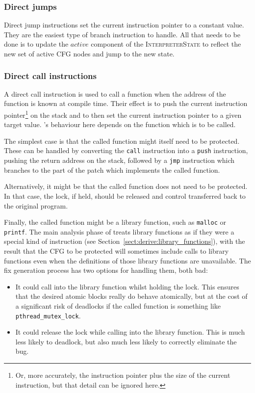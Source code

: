 \subsubsection{Direct jumps}

 Direct jump
instructions set the current instruction pointer to a constant value.
They are the easiest type of branch instruction to handle.  All that
needs to be done is to update the $\mathit{active}$ component of the
\textsc{InterpreterState} to reflect the new set of active CFG nodes
and jump to the new state.

\subsubsection{Direct call instructions}

A direct call instruction is used to call a function when the address
of the function is known at compile time.  Their effect is to push the
current instruction pointer\footnote{Or, more accurately, the
  instruction pointer plus the size of the current instruction, but
  that detail can be ignored here.} on the stack and to then set the
current instruction pointer to a given target value.
{\Implementation}'s behaviour here depends on the function which is to
be called.

The simplest case is that the called function might itself need to be
protected.  These can be handled by converting the \texttt{call}
instruction into a \texttt{push} instruction, pushing the return
address on the stack, followed by a \texttt{jmp} instruction which
branches to the part of the patch which implements the called
function.

Alternatively, it might be that the called function does not need to
be protected.  In that case, the lock, if held, should be released and
control transferred back to the original program.

Finally, the called function might be a library function, such as
\texttt{malloc} or \texttt{printf}.  The main analysis
phase of {\technique} treats library functions as if they were a
special kind of instruction (see
Section~\ref{sect:derive:library_functions}), with the result that the CFG to be
protected will sometimes include calls to library functions even when
the definitions of those library functions are unavailable.  The fix
generation process has two options for handling them, both bad:

\begin{itemize}
\item It could call into the library function whilst holding the lock.
  This ensures that the desired atomic blocks really do behave
  atomically, but at the cost of a significant risk of deadlocks if
  the called function is something like \texttt{pthread\_mutex\_lock}.
\item It could release the lock while calling into the library
  function.  This is much less likely to deadlock, but also much
  less likely to correctly eliminate the bug.
\end{itemize}

